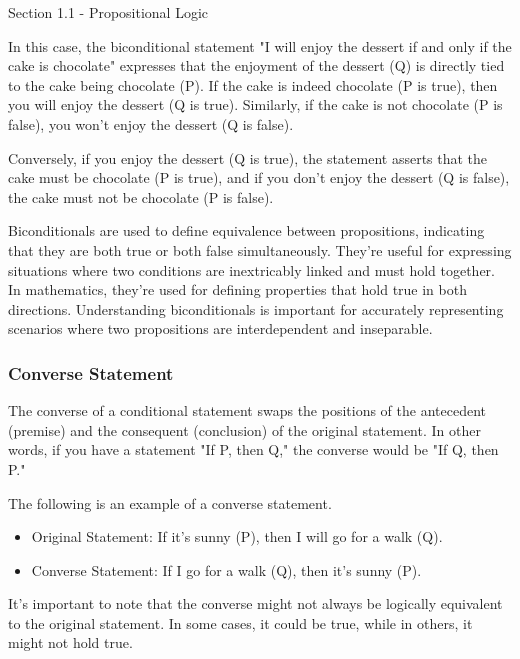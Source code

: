 \begin{notes}{Section 1.1 - Propositional Logic}
\begin{Highlight}
        In this case, the biconditional statement "I will enjoy the dessert if and only if the cake is chocolate" expresses that the enjoyment of the dessert (Q) is directly tied to the cake being chocolate (P). If the cake 
        is indeed chocolate (P is true), then you will enjoy the dessert (Q is true). Similarly, if the cake is not chocolate (P is false), you won't enjoy the dessert (Q is false).

        Conversely, if you enjoy the dessert (Q is true), the statement asserts that the cake must be chocolate (P is true), and if you don't enjoy the dessert (Q is false), the cake must not be chocolate (P is false).
    \end{Highlight}

    Biconditionals are used to define equivalence between propositions, indicating that they are both true or both false simultaneously. They're useful for expressing situations where two conditions are inextricably linked and 
    must hold together. In mathematics, they're used for defining properties that hold true in both directions. Understanding biconditionals is important for accurately representing scenarios where two propositions are 
    interdependent and inseparable.

    \subsubsection*{Converse Statement}

    The converse of a conditional statement swaps the positions of the antecedent (premise) and the consequent (conclusion) of the original statement. In other words, if you have a statement "If P, then Q," the converse would 
    be "If Q, then P."

    \begin{Highlight}
        The following is an example of a converse statement.

        \begin{itemize}
            \item Original Statement: If it's sunny (P), then I will go for a walk (Q).
            \item Converse Statement: If I go for a walk (Q), then it's sunny (P).
        \end{itemize}

        It's important to note that the converse might not always be logically equivalent to the original statement. In some cases, it could be true, while in others, it might not hold true.
    \end{Highlight}


\end{notes}
